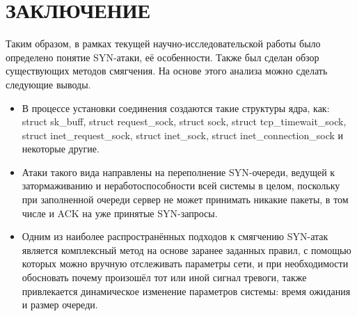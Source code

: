 \section*{ЗАКЛЮЧЕНИЕ}
Таким образом, в рамках текущей научно-исследовательской работы было определено понятие SYN-атаки, её особенности. Также был сделан обзор существующих методов смягчения. На основе этого анализа можно сделать следующие выводы.
\begin{itemize}
	\item В процессе установки соединения создаются такие структуры ядра, как: struct sk\_buff, struct request\_sock, struct sock, struct tcp\_timewait\_sock, struct inet\_request\_sock, struct inet\_sock, struct inet\_connection\_sock и некоторые другие.
	
	\item Атаки такого вида направлены на переполнение SYN-очереди, ведущей к затормаживанию и неработоспособности всей системы в целом, поскольку при заполненной очереди сервер не может принимать никакие пакеты, в том числе и ACK на уже принятые SYN-запросы.
	
	\item Одним из наиболее распространённых подходов к смягчению SYN-атак является комплексный метод на основе заранее заданных правил, с помощью которых можно вручную отслеживать параметры сети, и при необходимости обосновать почему произошёл тот или иной сигнал тревоги, также привлекается динамическое изменение параметров системы: время ожидания и размер очереди.
\end{itemize}
